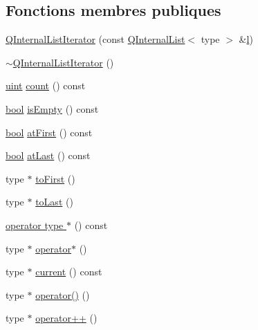 \subsection*{Fonctions membres publiques}
\begin{DoxyCompactItemize}
\item 
\hyperlink{class_q_internal_list_iterator_adc856ef0e420d1571641b243cebd288e}{Q\+Internal\+List\+Iterator} (const \hyperlink{class_q_internal_list}{Q\+Internal\+List}$<$ type $>$ \&\hyperlink{060__command__switch_8tcl_aff56f84b49947b84b2a304f51cf8e678}{l})
\item 
\hyperlink{class_q_internal_list_iterator_a8ee934213d728bf6a4fc05dfd2e24e1a}{$\sim$\+Q\+Internal\+List\+Iterator} ()
\item 
\hyperlink{qglobal_8h_a4d3943ddea65db7163a58e6c7e8df95a}{uint} \hyperlink{class_q_internal_list_iterator_a1b4734faf52964c9750c4d62afcbc6ac}{count} () const 
\item 
\hyperlink{qglobal_8h_a1062901a7428fdd9c7f180f5e01ea056}{bool} \hyperlink{class_q_internal_list_iterator_ab4e4d8bb837b9618d801e937f9a27ba7}{is\+Empty} () const 
\item 
\hyperlink{qglobal_8h_a1062901a7428fdd9c7f180f5e01ea056}{bool} \hyperlink{class_q_internal_list_iterator_ad1963db2001bebe8e78f165692ab42f1}{at\+First} () const 
\item 
\hyperlink{qglobal_8h_a1062901a7428fdd9c7f180f5e01ea056}{bool} \hyperlink{class_q_internal_list_iterator_ac19c1448a566a289bc06c385c67f7f1f}{at\+Last} () const 
\item 
type $\ast$ \hyperlink{class_q_internal_list_iterator_af7acae988506f9cba49a5d17c40c682c}{to\+First} ()
\item 
type $\ast$ \hyperlink{class_q_internal_list_iterator_a2042a5c5b6c0f470e97aafe06024d1c2}{to\+Last} ()
\item 
\hyperlink{class_q_internal_list_iterator_a263f63e2e677884ee6a1091782809cd1}{operator type $\ast$} () const 
\item 
type $\ast$ \hyperlink{class_q_internal_list_iterator_a0499c3f698f8151fc8662aef91c380cd}{operator$\ast$} ()
\item 
type $\ast$ \hyperlink{class_q_internal_list_iterator_a99d8e8cb4054e0f20164a55b91dc7b1e}{current} () const 
\item 
type $\ast$ \hyperlink{class_q_internal_list_iterator_a3a8d473fc1f269bab890060f0263cac3}{operator()} ()
\item 
type $\ast$ \hyperlink{class_q_internal_list_iterator_adcf215698697aff291a1475c94399749}{operator++} ()

\end{DoxyCompactItemize}

